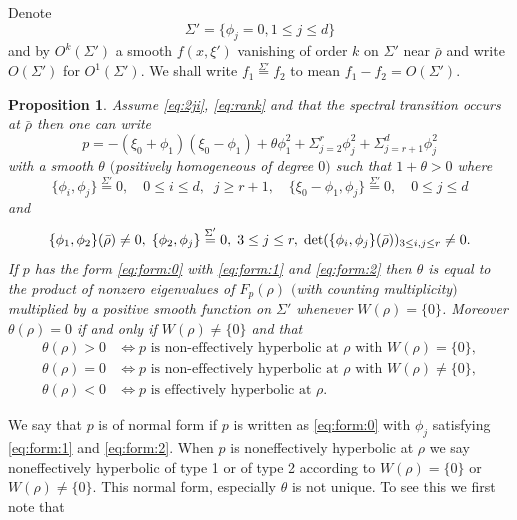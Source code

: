 \documentclass[12pt,leqno]{article} %
\def\sieq{\overset{\Sigma'}{=}}
\def\bro{\bar\rho}
\def\bro{\bar\rho}
\numberwithin{equation}{section}
\newtheorem{prop}{Proposition}[section]
\begin{document}
%
Denote 
%
\[
\Sigma'=\{\phi_j=0, 1\leq j\leq d\}
\]
%
and by $O^k(\Sigma')$ a smooth $f(x,\xi')$ vanishing of order $k$ on $\Sigma'$ near $\bro$ and write $O(\Sigma')$ for $O^1(\Sigma')$. We shall write $f_1\sieq f_2$ to mean $f_1-f_2=O(\Sigma')$.
%
%
\begin{prop}
\label{pro:form:1}Assume \eqref{eq:2ji}, \eqref{eq:rank} and that the spectral transition occurs at $\bro$ then one can write 
%
\begin{equation}
\label{eq:form:0}
p=-(\xi_0+\phi_1)(\xi_0-\phi_1)+\theta\phi_1^2+\Sigma_{j=2}^r\phi_j^2+\Sigma_{j=r+1}^d\phi_j^2
\end{equation}
%
with a smooth $\theta$ $($positively homogeneous of degree $0$$)$ such that $1+\theta> 0$ where
%
\begin{equation}
\label{eq:form:1}
\{\phi_i,\phi_j\}\sieq 0,\quad 0\leq i\leq d,\;\;j\geq r+1,\quad \{\xi_0-\phi_1,\phi_j\}\sieq 0,\quad 0\leq j\leq d
\end{equation}
%
and
%
\begin{equation}
\label{eq:form:2}
\{\phi_1,\phi_2\}(\bro)\neq 0,\; \{\phi_2,\phi_j\}\sieq 0, \; 3\leq j\leq r,\; {\rm det}(\{\phi_i,\phi_j\}(\bro))_{3\leq i,j\leq r}\neq 0.
\end{equation}
%
If $p$ has the form  \eqref{eq:form:0} with \eqref{eq:form:1} and \eqref{eq:form:2} then $\theta$ is equal to the product of nonzero eigenvalues of $F_p(\rho)$ $($with counting multiplicity$)$ multiplied by a positive smooth function on $\Sigma'$ whenever $W(\rho)=\{0\}$. Moreover 
$\theta(\rho)=0$ if and only if $W(\rho)\neq \{0\}$ and that
%
\begin{equation}
\label{eq:te:seifu}
\begin{split}
\theta(\rho)>0&\Longleftrightarrow \text{$p$ is non-effectively hyperbolic at $\rho$ with $W(\rho)=\{0\}$},\\
\theta(\rho)=0&\Longleftrightarrow \text{$p$ is non-effectively hyperbolic at $\rho$ with $W(\rho)\neq \{0\}$},\\
\theta(\rho)<0&\Longleftrightarrow  \text{$p$ is effectively hyperbolic at $\rho$.}
\end{split}
\end{equation}
\end{prop}
We say that $p$ is of normal form if $p$ is written as \eqref{eq:form:0} with $\phi_j$ satisfying \eqref{eq:form:1} and \eqref{eq:form:2}. When $p$ is noneffectively hyperbolic at $\rho$ we say noneffectively hyperbolic of type 1 or of type 2 according to $W(\rho)=\{0\}$ or $W(\rho)\neq \{0\}$. This normal form, especially $\theta$ is not unique. To see this we first note that
\end{document}
